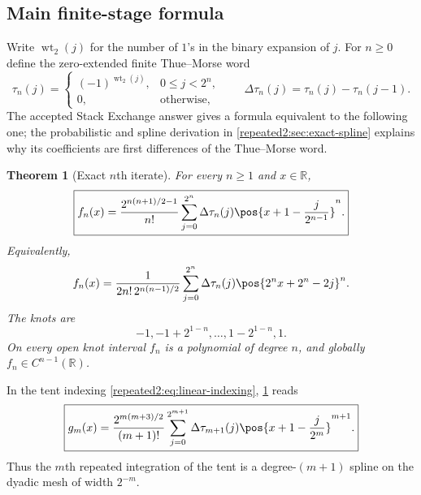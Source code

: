 \documentclass[11pt,oneside]{article}
\newtheorem{theorem}{Theorem}[section]
\theoremstyle{definition}
\theoremstyle{remark}
\newcommand{\R}{\mathbb R}
\newcommand{\wt}{\operatorname{wt}_2}
\begin{document}
\subsection{Main finite-stage formula}

Write $\wt(j)$ for the number of $1$'s in the binary expansion of $j$.  For $n\ge0$ define
the zero-extended finite Thue--Morse word
\begin{equation}
 \tau_n(j)=
 \begin{cases}
  (-1)^{\wt(j)},&0\le j<2^n,\\
  0,&\text{otherwise},
 \end{cases}
 \qquad
 \Delta\tau_n(j)=\tau_n(j)-\tau_n(j-1).
 \label{repeated2:eq:tau-definition}
\end{equation}
The accepted Stack Exchange answer gives a formula equivalent to the following one; the
probabilistic and spline derivation in \cref{repeated2:sec:exact-spline} explains why its coefficients
are first differences of the Thue--Morse word.

\begin{theorem}[Exact $n$th iterate]
\label{repeated2:thm:exact-iterate-intro}
For every $n\ge1$ and $x\in\R$,
\begin{equation}
 \boxed{\displaystyle
 f_n(x)=\frac{2^{n(n+1)/2-1}}{n!}
 \sum_{j=0}^{2^n}\Delta\tau_n(j)
 \pos{x+1-\frac{j}{2^{n-1}}}^{n}.}
 \label{repeated2:eq:exact-iterate-intro}
\end{equation}
Equivalently,
\begin{equation}
 f_n(x)=\frac{1}{2n!\,2^{n(n-1)/2}}
 \sum_{j=0}^{2^n}\Delta\tau_n(j)
 \pos{2^nx+2^n-2j}^{n}.
 \label{repeated2:eq:exact-iterate-mse-scaling}
\end{equation}
The knots are
\begin{equation}
 -1,-1+2^{1-n},\ldots,1-2^{1-n},1.
 \label{repeated2:eq:iterate-knots}
\end{equation}
On every open knot interval $f_n$ is a polynomial of degree $n$, and globally
$f_n\in C^{n-1}(\R)$.
\end{theorem}

In the tent indexing \eqref{repeated2:eq:linear-indexing}, \cref{repeated2:thm:exact-iterate-intro} reads
\begin{equation}
 \boxed{\displaystyle
 g_m(x)=\frac{2^{m(m+3)/2}}{(m+1)!}
 \sum_{j=0}^{2^{m+1}}\Delta\tau_{m+1}(j)
 \pos{x+1-\frac{j}{2^m}}^{m+1}.}
 \label{repeated2:eq:exact-tent-indexing}
\end{equation}
Thus the $m$th repeated integration of the tent is a degree-$(m+1)$ spline on the dyadic
mesh of width $2^{-m}$.
\end{document}
